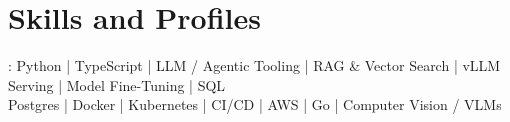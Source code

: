 \documentclass[print]{jack-resume}
\begin{document}
\pagecolor{darkmodeBackground}

%
%



%
%
\begin{minipage}[t][1cm][t]{.03\textwidth}
    \hfill
\end{minipage}






\section{Skills and Profiles}
:
Python \hfill | \hfill
TypeScript \hfill | \hfill
LLM / Agentic Tooling \hfill | \hfill
RAG \& Vector Search \hfill | \hfill
vLLM Serving \hfill | \hfill
Model Fine-Tuning \hfill | \hfill
SQL \\
\hspace{1.0cm} Postgres \hfill | \hfill
Docker \hfill | \hfill
Kubernetes \hfill | \hfill
CI/CD \hfill | \hfill
AWS \hfill | \hfill
Go \hfill | \hfill
Computer Vision / VLMs \\
\end{document}
